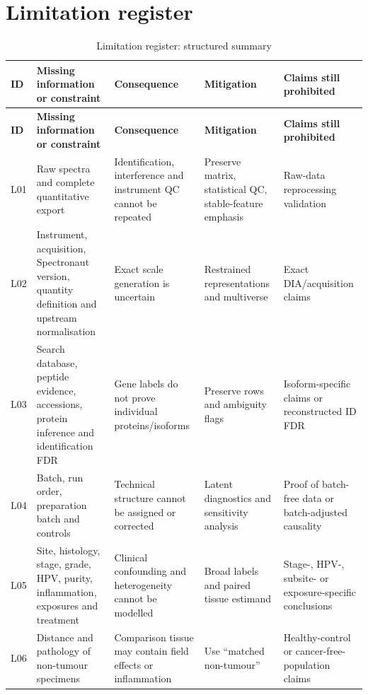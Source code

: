\section{Limitation register}
\label{sec:limitation_register}

\begin{longtable}{@{}>{\raggedright\arraybackslash}p{} >{\raggedright\arraybackslash}p{} >{\raggedright\arraybackslash}p{} >{\raggedright\arraybackslash}p{} >{\raggedright\arraybackslash}p{}@{}}
\caption{Limitation register: structured summary}\\
\toprule
\textbf{ID} & \textbf{Missing information or constraint} & \textbf{Consequence} & \textbf{Mitigation} & \textbf{Claims still prohibited} \\
\midrule
\endfirsthead
\toprule
\textbf{ID} & \textbf{Missing information or constraint} & \textbf{Consequence} & \textbf{Mitigation} & \textbf{Claims still prohibited} \\
\midrule
\endhead
L01 & Raw spectra and complete quantitative export & Identification, interference and instrument QC cannot be repeated & Preserve matrix, statistical QC, stable-feature emphasis & Raw-data reprocessing validation \\
L02 & Instrument, acquisition, Spectronaut version, quantity definition and upstream normalisation & Exact scale generation is uncertain & Restrained representations and multiverse & Exact DIA/acquisition claims \\
L03 & Search database, peptide evidence, accessions, protein inference and identification FDR & Gene labels do not prove individual proteins/isoforms & Preserve rows and ambiguity flags & Isoform-specific claims or reconstructed ID FDR \\
L04 & Batch, run order, preparation batch and controls & Technical structure cannot be assigned or corrected & Latent diagnostics and sensitivity analysis & Proof of batch-free data or batch-adjusted causality \\
L05 & Site, histology, stage, grade, HPV, purity, inflammation, exposures and treatment & Clinical confounding and heterogeneity cannot be modelled & Broad labels and paired tissue estimand & Stage-, HPV-, subsite- or exposure-specific conclusions \\
L06 & Distance and pathology of non-tumour specimens & Comparison tissue may contain field effects or inflammation & Use “matched non-tumour” & Healthy-control or cancer-free-population claims \\

\end{longtable}
